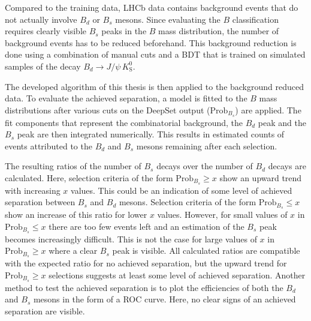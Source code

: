 
Compared to the training data, LHCb data contains background events that do not actually involve $B_d$ or $B_s$ mesons.
Since evaluating the $B$ classification requires clearly visible $B_s$ peaks in the $B$ mass distribution, the number of background events has to be reduced beforehand.
This background reduction is done using a combination of manual cuts and a BDT that is trained on simulated samples of the decay $B_d \rightarrow J/\psi \, K^0_\text{S}$.

The developed algorithm of this thesis is then applied to the background reduced data.
To evaluate the achieved separation, a model is fitted to the $B$ mass distributions after various cuts on the DeepSet output ($\text{Prob}_{B_s}$) are applied.
The fit components that represent the combinatorial background, the $B_d$ peak and the $B_s$ peak are then integrated numerically.
This results in estimated counts of events attributed to the $B_d$ and $B_s$ mesons remaining after each selection.

The resulting ratios of the number of $B_s$ decays over the number of $B_d$ decays are calculated.
Here, selection criteria of the form $\text{Prob}_{B_s} \geq x$ show an upward trend with increasing $x$ values.
This could be an indication of some level of achieved separation between $B_s$ and $B_d$ mesons.
Selection criteria of the form $\text{Prob}_{B_s} \leq x$ show an increase of this ratio for lower $x$ values.
However, for small values of $x$ in $\text{Prob}_{B_s} \leq x$ there are too few events left and an estimation of the $B_s$ peak becomes increasingly difficult. 
This is not the case for large values of $x$ in $\text{Prob}_{B_s} \geq x$ where a clear $B_s$ peak is visible.
All calculated ratios are compatible with the expected ratio for no achieved separation, but the upward trend for $\text{Prob}_{B_s} \geq x$ selections suggests at least some level of achieved separation.
Another method to test the achieved separation is to plot the efficiencies of both the $B_d$ and $B_s$ mesons in the form of a ROC curve.
Here, no clear signs of an achieved separation are visible.

